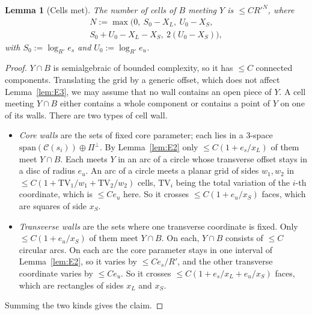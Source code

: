 \documentclass[aps,prx,twocolumn,superscriptaddress,nofootinbib,longbibliography]{revtex4-2}
\theoremstyle{plain}
\newtheorem{lemma}{Lemma}
\theoremstyle{definition}
\theoremstyle{remark}
\begin{document}
\begin{lemma}[Cells met]\label{lem:E4}
The number of cells of $B$ meeting $Y$ is $\le C R'^{N}$, where
\[
\begin{gathered}
N:=\max\big(0,\ S_0-X_L,\ U_0-X_S,\\ S_0+U_0-X_L-X_S,\ 2(U_0-X_S)\big),
\end{gathered}
\]
with $S_0:=\log_{R'}e_s$ and $U_0:=\log_{R'}e_u$.
\end{lemma}
\begin{proof}
$Y\cap B$ is semialgebraic of bounded complexity, so it has $\le C$ connected components. Translating the grid by a generic offset, which does not affect Lemma~\ref{lem:E3}, we may assume that no wall contains an open piece of $Y$. A cell meeting $Y\cap B$ either contains a whole component or contains a point of $Y$ on one of its walls. There are two types of cell wall.
\begin{itemize}\setlength\itemsep{0pt}
\item \emph{Core walls} are the sets of fixed core parameter; each lies in a $3$-space $\mathrm{span}(\mathcal C(s_i))\oplus\Pi^\perp$. By Lemma~\ref{lem:E2} only $\le C(1+e_s/x_L)$ of them meet $Y\cap B$. Each meets $Y$ in an arc of a circle whose transverse offset stays in a disc of radius $e_u$. An arc of a circle meets a planar grid of sides $w_1,w_2$ in $\le C(1+\mathrm{TV}_1/w_1+\mathrm{TV}_2/w_2)$ cells, $\mathrm{TV}_i$ being the total variation of the $i$-th coordinate, which is $\le Ce_u$ here. So it crosses $\le C(1+e_u/x_S)$ faces, which are squares of side $x_S$.
\item \emph{Transverse walls} are the sets where one transverse coordinate is fixed. Only $\le C(1+e_u/x_S)$ of them meet $Y\cap B$. On each, $Y\cap B$ consists of $\le C$ circular arcs. On each arc the core parameter stays in one interval of Lemma~\ref{lem:E2}, so it varies by $\le Ce_s/R'$, and the other transverse coordinate varies by $\le Ce_u$. So it crosses $\le C(1+e_s/x_L+e_u/x_S)$ faces, which are rectangles of sides $x_L$ and $x_S$.
\end{itemize}
Summing the two kinds gives the claim.
\end{proof}
\end{document}
